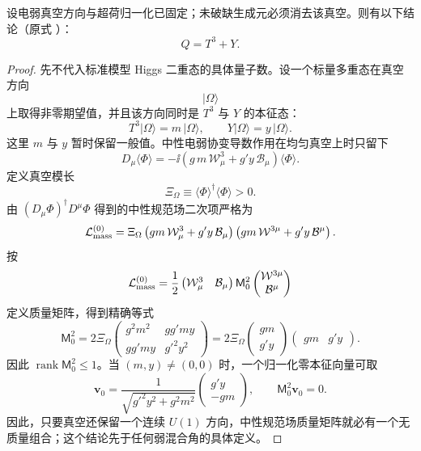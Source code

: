 \begin{proposition}[真空稳定子的电荷生成元]
设电弱真空方向与超荷归一化已固定；未破缺生成元必须消去该真空。则有以下结论（原式 ）：
\begin{equation*}
 \boxed{Q=T^3+Y.}
\end{equation*}
\end{proposition}
\begin{proof}
先不代入标准模型 Higgs 二重态的具体量子数。设一个标量多重态在真空方向
\[
|\Omega\rangle
\]
上取得非零期望值，并且该方向同时是 \(T^3\) 与 \(Y\) 的本征态：
\[
T^3|\Omega\rangle
=
m\,|\Omega\rangle,
\qquad
Y|\Omega\rangle
=
y\,|\Omega\rangle.
\]
这里 \(m\) 与 \(y\) 暂时保留一般值。中性电弱协变导数作用在均匀真空上时只留下
\[
D_\mu\langle\Phi\rangle
=
-\ii
\left(
g\,m\,\mathcal W_\mu^3
+
g' y\,\mathcal B_\mu
\right)
\langle\Phi\rangle.
\]
定义真空模长
\[
\Xi_\Omega\equiv
\langle\Phi\rangle^\dagger\langle\Phi\rangle>0.
\]
由
\(
(D_\mu\Phi)^\dagger D^\mu\Phi
\)
得到的中性规范场二次项严格为
\[
\mathcal L_{\rm mass}^{(0)}
=\Xi_\Omega
\left(
gm\,\mathcal W_\mu^3+g'y\,\mathcal B_\mu
\right)
\left(
gm\,\mathcal W^{3\mu}+g'y\,\mathcal B^\mu
\right).
\]
按
\[
\mathcal L_{\rm mass}^{(0)}
=\frac12
\begin{pmatrix}\mathcal W_\mu^3&\mathcal B_\mu\end{pmatrix}
\mathsf M_0^2
\begin{pmatrix}\mathcal W^{3\mu}\\\mathcal B^\mu\end{pmatrix}
\]
定义质量矩阵，得到精确等式
\[
\mathsf M_0^2
=2\Xi_\Omega
\begin{pmatrix}
g^2m^2 & gg'my\\
gg'my & g'^2y^2
\end{pmatrix}
=2\Xi_\Omega
\begin{pmatrix}gm\\ g'y\end{pmatrix}
\begin{pmatrix}gm & g'y\end{pmatrix}.
\]
因此 $\operatorname{rank}\mathsf M_0^2\le1$。当 $(m,y)\neq(0,0)$ 时，一个归一化零本征向量可取
\[
\mathbf v_0
=\frac1{\sqrt{g'^2y^2+g^2m^2}}
\begin{pmatrix}
g'y\\-gm
\end{pmatrix},
\qquad
\mathsf M_0^2\mathbf v_0=0.
\]
因此，只要真空还保留一个连续 \(U(1)\) 方向，中性规范场质量矩阵就必有一个无质量组合；这个结论先于任何弱混合角的具体定义。


\end{proof}
